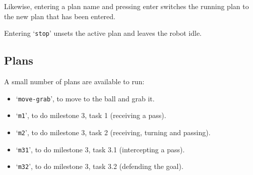 ﻿\documentclass[12pt,a4paper]{article}
\begin{document}
Likewise, entering a plan name and pressing enter switches the running plan to the new plan that has been entered. 

Entering `\texttt{stop}' unsets the active plan and leaves the robot idle.

\subsection{Plans}

A small number of plans are available to run:

\begin{itemize}
    \item `\texttt{move-grab}', to move to the ball and grab it.
    \item `\texttt{m1}', to do milestone 3, task 1 (receiving a pass).
    \item `\texttt{m2}', to do milestone 3, task 2 (receiving, turning and passing).
    \item `\texttt{m31}', to do milestone 3, task 3.1 (intercepting a pass).
    \item `\texttt{m32}', to do milestone 3, task 3.2 (defending the goal).
\end{itemize}








\end{document}
